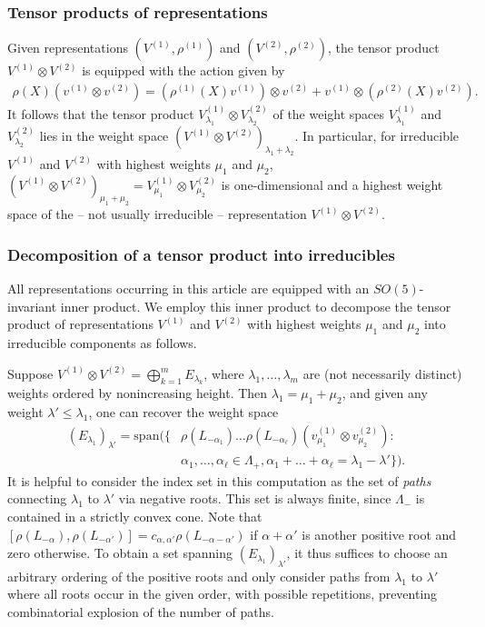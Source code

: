 \documentclass[11pt,reqno]{amsart}
\theoremstyle{remark}
\theoremstyle{definition}
\begin{document}
\subsubsection{Tensor products of representations}
Given representations $(V^{(1)},\rho^{(1)})$ and $(V^{(2)},\rho^{(2)})$, the tensor product $V^{(1)}\otimes V^{(2)}$ is equipped with the action given by
\begin{align*}
    \rho(X) ( v^{(1)} \otimes v^{(2)} ) = (\rho^{(1)}(X) v^{(1)}) \otimes v^{(2)} + v^{(1)} \otimes (\rho^{(2)}(X) v^{(2)}).
\end{align*}
It follows that the tensor product $V^{(1)}_{\lambda_1} \otimes V^{(2)}_{\lambda_2}$ of the weight spaces $V^{(1)}_{\lambda_1}$ and $V^{(2)}_{\lambda_2}$ lies in the weight space $(V^{(1)} \otimes V^{(2)})_{\lambda_1 + \lambda_2}$. In particular, for irreducible $V^{(1)}$ and $V^{(2)}$ with highest weights $\mu_1$ and $\mu_2$, $(V^{(1)} \otimes V^{(2)})_{\mu_1 + \mu_2} = V^{(1)}_{\mu_1} \otimes V^{(2)}_{\mu_2}$ is one-dimensional and a highest weight space of the -- not usually irreducible -- representation $V^{(1)} \otimes V^{(2)}$.

\subsubsection{Decomposition of a tensor product into irreducibles}
\label{sec:layer_stripping}
All representations occurring in this article are equipped with an $SO(5)$-invariant inner product. We employ this inner product to decompose the tensor product of representations $V^{(1)}$ and $V^{(2)}$ with highest weights $\mu_1$ and $\mu_2$ into irreducible components as follows.

Suppose $V^{(1)} \otimes V^{(2)} = \bigoplus_{k=1}^m E_{\lambda_k}$, where $\lambda_1,\ldots,\lambda_m$ are (not necessarily distinct) weights ordered by nonincreasing height. Then $\lambda_1 = \mu_1 + \mu_2$, and given any weight $\lambda' \le \lambda_1$, one can recover the weight space
\begin{align*}
    \left(E_{\lambda_1}\right)_{\lambda'} = \mathrm{span}\big(\big\{ &\rho(L_{ - \alpha_1}) \ldots \rho(L_{ - \alpha_\ell}) (v^{(1)}_{\mu_1} \otimes v^{(2)}_{\mu_2}) : \\ &\alpha_1,\ldots,\alpha_\ell \in \Lambda_+, \alpha_1 + \ldots + \alpha_\ell = \lambda_1 - \lambda' \big\}\big).
\end{align*}
It is helpful to consider the index set in this computation as the set of \emph{paths} connecting $\lambda_1$ to $\lambda'$ via negative roots. This set is always finite, since $\Lambda_-$ is contained in a strictly convex cone.
Note that $[\rho(L_{- \alpha}), \rho(L_{- \alpha'})] = c_{\alpha,\alpha'} \rho(L_{- \alpha - \alpha'})$ if $\alpha + \alpha'$ is another positive root and zero otherwise. To obtain a set spanning $\left(E_{\lambda_1}\right)_{\lambda'}$, it thus suffices to choose an arbitrary ordering of the positive roots and only consider paths from $\lambda_1$ to $\lambda'$ where all roots occur in the given order, with possible repetitions, preventing combinatorial explosion of the number of paths.
\end{document}
